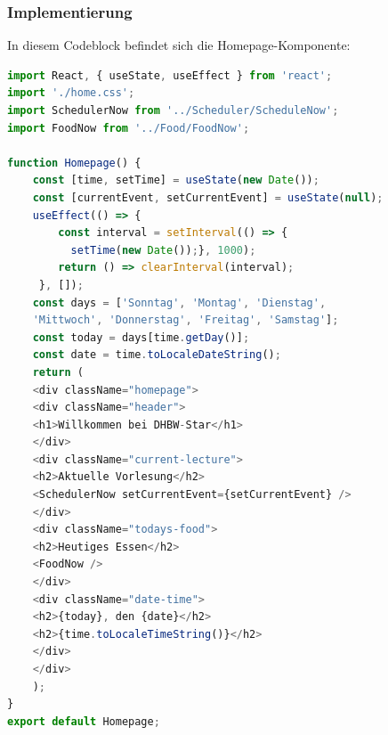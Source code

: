 \subsubsection{Implementierung}
In diesem Codeblock befindet sich die Homepage-Komponente:\\
\begin{lstlisting}[language=JavaScript,
	frame=single,           % Ein Rahmen um den Code
	framexleftmargin=15pt,  % Rahmen link von den Zahlen
	style=algoBericht,
	label={Homepage-Komponente},
	captionpos=b ,          % Caption unter den Code setzen
	caption={Homepage-Komponente}]
import React, { useState, useEffect } from 'react';
import './home.css';
import SchedulerNow from '../Scheduler/ScheduleNow';
import FoodNow from '../Food/FoodNow';

function Homepage() {
    const [time, setTime] = useState(new Date());
    const [currentEvent, setCurrentEvent] = useState(null);
    useEffect(() => {
    	const interval = setInterval(() => {
          setTime(new Date());}, 1000);
        return () => clearInterval(interval);
     }, []);
    const days = ['Sonntag', 'Montag', 'Dienstag', 
    'Mittwoch', 'Donnerstag', 'Freitag', 'Samstag'];
    const today = days[time.getDay()];
    const date = time.toLocaleDateString();
    return (
    <div className="homepage">
    <div className="header">
    <h1>Willkommen bei DHBW-Star</h1>
    </div>
    <div className="current-lecture">
    <h2>Aktuelle Vorlesung</h2>
    <SchedulerNow setCurrentEvent={setCurrentEvent} />
    </div>
    <div className="todays-food">
    <h2>Heutiges Essen</h2>
    <FoodNow />
    </div>
    <div className="date-time">
    <h2>{today}, den {date}</h2>
    <h2>{time.toLocaleTimeString()}</h2>
    </div>
    </div>
    );
}
export default Homepage;
	
\end{lstlisting}

